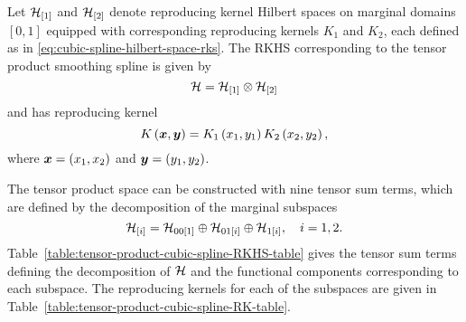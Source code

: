 \bigskip

Let $\mathcal{H}_{\left[1\right]}$ and $\mathcal{H}_{\left[2\right]}$ denote reproducing kernel Hilbert spaces on marginal domains $\left[0, 1\right]$ equipped with corresponding reproducing kernels $K_1$ and $K_2$, each defined as in \eqref{eq:cubic-spline-hilbert-space-rks}. The RKHS corresponding to the tensor product smoothing spline is given by
\[
\mathcal{H} = \mathcal{H}_{\left[1\right]} \otimes \mathcal{H}_{\left[2\right]}
\]
\noindent
and has reproducing kernel 
\[
K\left(\mbox{\boldmath $x$},\mbox{\boldmath $y$}\right) = K_1\left(x_1,y_1\right) K_2\left(x_{2},y_{2}\right),
\]
\noindent 
where $\mbox{\boldmath $x$} = \left(x_1, x_2\right)$ and $\mbox{\boldmath $y$} = \left(y_1, y_2\right)$.

\bigskip

The tensor product space can be constructed with nine tensor sum terms, which are defined by the decomposition of the marginal subspaces
\[
\mathcal{H}_{\left[i\right]} = \mathcal{H}_{00\left[1\right]}  \oplus  \mathcal{H}_{01\left[i\right]} \oplus \mathcal{H}_{1\left[i\right]}, \quad i = 1,2.
\]
\noindent
Table~\ref{table:tensor-product-cubic-spline-RKHS-table} gives the tensor sum terms defining the decomposition of $\mathcal{H}$ and the functional components corresponding to each subspace. The reproducing kernels for each of the subspaces are given in Table~\ref{table:tensor-product-cubic-spline-RK-table}.


